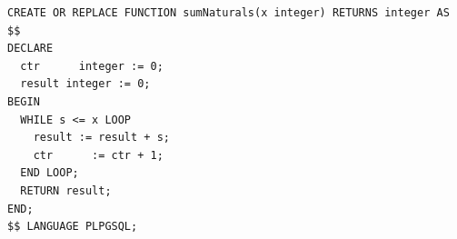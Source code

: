 \documentclass[12pt]{cmuthesis}
\begin{document}
    \begin{listing}
    \begin{verbatim}
CREATE OR REPLACE FUNCTION sumNaturals(x integer) RETURNS integer AS $$
DECLARE
  ctr      integer := 0;
  result integer := 0;
BEGIN
  WHILE s <= x LOOP
    result := result + s;
    ctr      := ctr + 1;
  END LOOP;
  RETURN result;
END;
$$ LANGUAGE PLPGSQL;
    \end{verbatim}
    \caption{\texttt{sumNaturals} function. This function sums the first $x$ natural numbers and returns the results.}
    \label{lst:loop}
    \end{listing}
\end{document}
